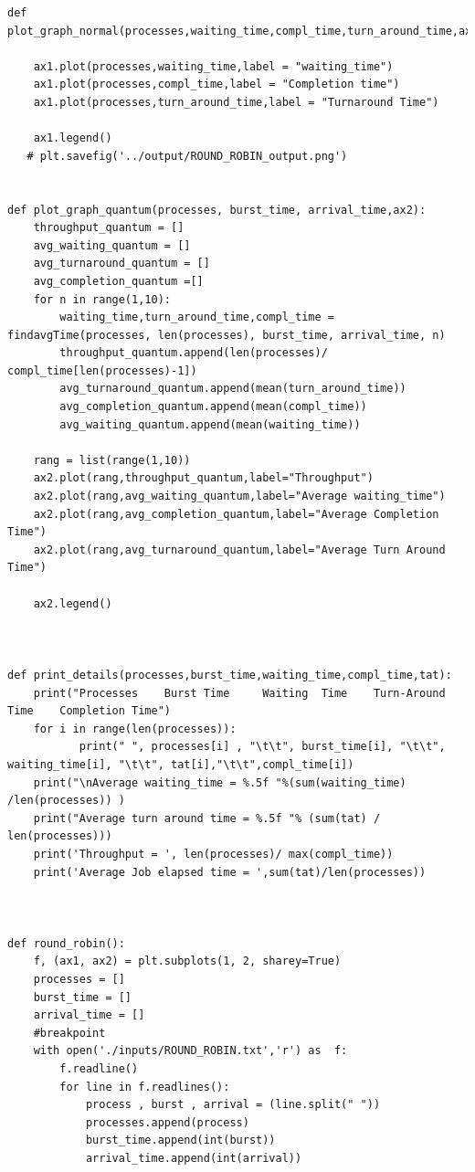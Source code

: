 \documentclass[11pt,a4paper]{report}
\begin{document}
\begin{lstlisting}[columns=fullflexible,caption = Round Robin Source Code,breaklines=true,postbreak=\mbox{\textcolor{red}{$\hookrightarrow$}\space},]
def plot_graph_normal(processes,waiting_time,compl_time,turn_around_time,ax1):
    
    ax1.plot(processes,waiting_time,label = "waiting_time")
    ax1.plot(processes,compl_time,label = "Completion time")
    ax1.plot(processes,turn_around_time,label = "Turnaround Time")

    ax1.legend()
   # plt.savefig('../output/ROUND_ROBIN_output.png')


def plot_graph_quantum(processes, burst_time, arrival_time,ax2):
    throughput_quantum = []
    avg_waiting_quantum = []
    avg_turnaround_quantum = []
    avg_completion_quantum =[]
    for n in range(1,10):
        waiting_time,turn_around_time,compl_time =  findavgTime(processes, len(processes), burst_time, arrival_time, n) 
        throughput_quantum.append(len(processes)/ compl_time[len(processes)-1])
        avg_turnaround_quantum.append(mean(turn_around_time))
        avg_completion_quantum.append(mean(compl_time))
        avg_waiting_quantum.append(mean(waiting_time))

    rang = list(range(1,10))
    ax2.plot(rang,throughput_quantum,label="Throughput")
    ax2.plot(rang,avg_waiting_quantum,label="Average waiting_time")
    ax2.plot(rang,avg_completion_quantum,label="Average Completion Time")
    ax2.plot(rang,avg_turnaround_quantum,label="Average Turn Around Time")

    ax2.legend()



def print_details(processes,burst_time,waiting_time,compl_time,tat):
    print("Processes    Burst Time     Waiting  Time    Turn-Around Time    Completion Time") 
    for i in range(len(processes)):
           print(" ", processes[i] , "\t\t", burst_time[i], "\t\t", waiting_time[i], "\t\t", tat[i],"\t\t",compl_time[i]) 
    print("\nAverage waiting_time = %.5f "%(sum(waiting_time) /len(processes)) ) 
    print("Average turn around time = %.5f "% (sum(tat) / len(processes)))  
    print('Throughput = ', len(processes)/ max(compl_time))
    print('Average Job elapsed time = ',sum(tat)/len(processes))



def round_robin():
    f, (ax1, ax2) = plt.subplots(1, 2, sharey=True)
    processes = []
    burst_time = []
    arrival_time = []
    #breakpoint
    with open('./inputs/ROUND_ROBIN.txt','r') as  f:
        f.readline()
        for line in f.readlines():
            process , burst , arrival = (line.split(" "))
            processes.append(process)
            burst_time.append(int(burst))
            arrival_time.append(int(arrival))



\end{lstlisting}
\end{document}
